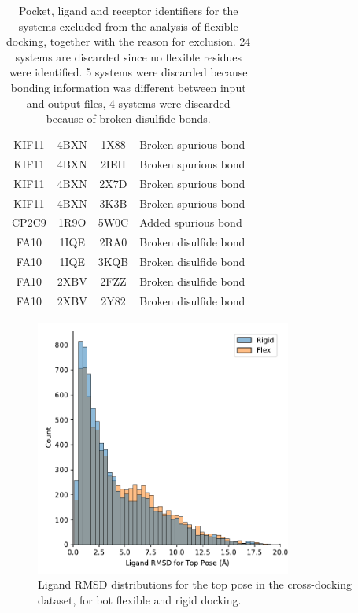 \documentclass[journal=jcisd8,manuscript=article]{achemso}
\begin{document}
\begin{table}[]
\begin{tabular}{c c c l}
KIF11 & 4BXN & 1X88 & Broken spurious bond \\
KIF11 & 4BXN & 2IEH & Broken spurious bond \\
KIF11 & 4BXN & 2X7D & Broken spurious bond \\
KIF11 & 4BXN & 3K3B & Broken spurious bond \\
CP2C9 & 1R9O & 5W0C & Added spurious bond \\
FA10 & 1IQE & 2RA0 & Broken disulfide bond \\
FA10 & 1IQE & 3KQB & Broken disulfide bond \\
FA10 & 2XBV	& 2FZZ & Broken disulfide bond \\
FA10 & 2XBV	& 2Y82 & Broken disulfide bond \\
\bottomrule
    \end{tabular}
    \caption{Pocket, ligand and receptor identifiers for the systems excluded from the analysis of flexible docking, together with the reason for exclusion. 24 systems are discarded since no flexible residues were identified. 5 systems were discarded because bonding information was different between input and output files, 4 systems were discarded because of broken disulfide bonds.}
    \label{tab:flexfail}
\end{table}

\begin{figure}    
	\centering
	\includegraphics[width=0.75\textwidth]{figures/crossdocking-flex/e8-rmsd_dists-LIG.pdf}
	\caption{Ligand RMSD distributions for the top pose in the cross-docking dataset, for bot flexible and rigid docking.}
	\label{fig:flexRMSDalldist}
\end{figure}  
\end{document}
